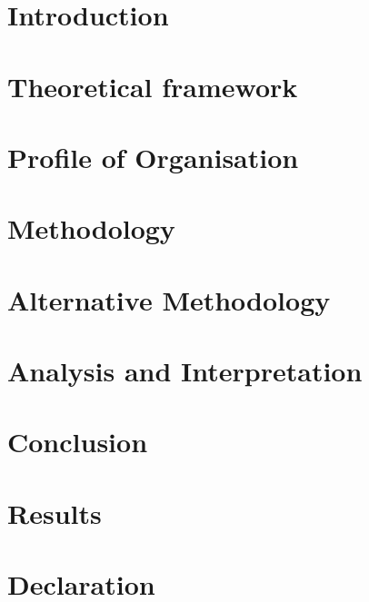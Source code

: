 \documentclass[12pt]{report}
\begin{document}
\tableofcontents

\chapter{Introduction}


\chapter{Theoretical framework} \label{tf}


\chapter{Profile of Organisation}


\chapter{Methodology} \label{m}


\chapter{Alternative Methodology} \label{am}


\chapter{Analysis and Interpretation}\label{ai}


\chapter{Conclusion} \label{c}


\chapter{Results} \label{ra}




\chapter*{Declaration}

\end{document}
